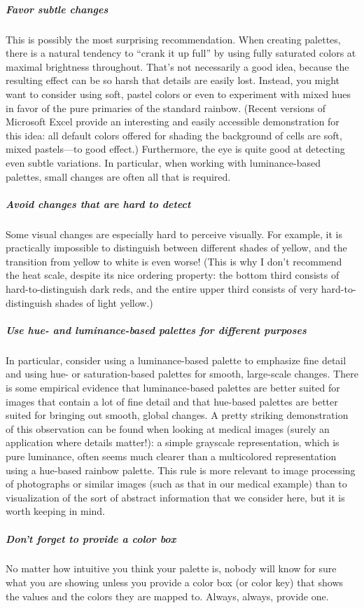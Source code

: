 \begin{unnumlist}
\subparagraph{Favor subtle changes}
\item This is possibly the most surprising
  recommendation. When creating palettes, there is a natural tendency
  to ``crank it up full'' by using fully saturated colors at maximal
  brightness throughout. That's not necessarily a good idea, because
  the resulting effect can be so harsh that details are easily lost.
  Instead, you might want to consider using soft, pastel colors or
  even to experiment with mixed hues in favor of the pure primaries of
  the standard rainbow. (Recent versions of Microsoft Excel provide an
  interesting and easily accessible demonstration for this idea: all
  default colors offered for shading the background of cells are soft,
  mixed pastels---to good effect.)  Furthermore, the eye is quite
  good at detecting even subtle variations.  In particular, when
  working with luminance-based palettes, small changes are often all
  that is required.

\subparagraph{Avoid changes that are hard to detect}
\item Some visual changes are
  especially hard to perceive visually. For example, it is practically
  impossible to distinguish between different shades of yellow, and
  the transition from yellow to white is even worse!  (This is why I
  don't recommend the heat scale, despite its nice ordering property:
  the bottom third consists of hard-to-distinguish dark reds, and the
  entire upper third consists of very hard-to-distinguish shades of
  light yellow.)

\subparagraph{Use hue- and luminance-based palettes for different purposes}
\item In
  particular, consider using a luminance-based palette to emphasize
  fine detail and using hue- or saturation-based palettes for smooth,
  large-scale changes. There is some empirical evidence that
  luminance-based palettes are better suited for images that contain a
  lot of fine detail and that hue-based palettes are better suited for
  bringing out smooth, global changes. A pretty striking demonstration
  of this observation can be found when looking at medical images
  (surely an application where details matter!): a simple grayscale
  representation, which is pure luminance, often seems much clearer
  than a multicolored representation using a hue-based rainbow
  palette.  This rule is more relevant\vadjust{\pagebreak} to image processing of
  photographs or similar images (such as that in our medical example)
  than to visualization of the sort of abstract information that we
  consider here, but it is worth keeping in mind.
  
\subparagraph{Don't forget to provide a color box}
\item No matter how intuitive you
  think your palette is, nobody will know for sure what you are
  showing unless you provide a color box (or color key) that shows the
  values and the colors they are mapped to.  Always, always, provide
  one.
\end{unnumlist}

